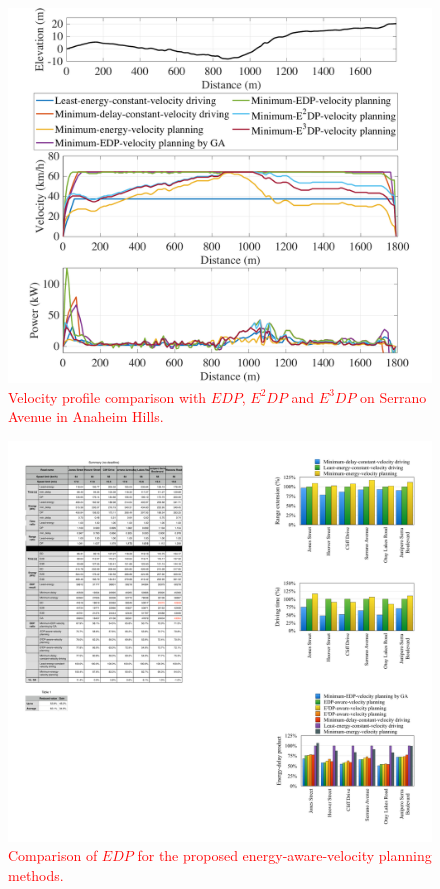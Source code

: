 \documentclass[onecolumn]{IEEEconf}
\begin{document}
\begin{description}
\begin{figure}
\centering
\renewcommand\thefigure{12}
\includegraphics[width=0.6\hsize]{Figures/EDP_comp_profile.pdf}
\caption{\textcolor{red}{Velocity profile comparison with $EDP$, $E^2DP$ and $E^3DP$ on  Serrano Avenue in Anaheim Hills.}}
\label{fig:EDP_aware_velocity_planning}
\end{figure} 

\begin{figure}
\centering
\renewcommand\thefigure{13}
\includegraphics[width=0.6\hsize]{Figures/EDP_comp_bar.pdf}
\caption{\textcolor{red}{Comparison of $EDP$ for the proposed energy-aware-velocity planning methods.}}
\label{fig:EDP_bar}
\end{figure} 

\end{description}
\newpage
~
\end{document}
